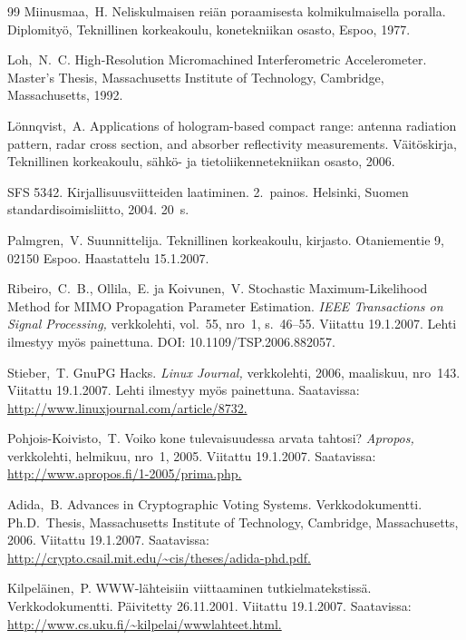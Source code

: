 \documentclass[english,12pt,a4paper,pdftex,sci,utf8]{aaltothesis}
\begin{document}
\begin{thebibliography}{99}
 Miinusmaa,\ H. Neliskulmaisen rei\"an poraamisesta
  kolmikulmaisella poralla. Diplomity\"o, Teknillinen korkeakoulu,
  konetekniikan osasto, Espoo, 1977.

 Loh,\ N.\ C. High-Resolution Micromachined
  Interferometric Accelerometer. Master's Thesis, Massachusetts
  Institute of Technology, Cambridge,
  Massachusetts, 1992.

 L\"onnqvist,\ A.
  Applications of hologram-based compact
    range: antenna radiation pattern, radar cross section, and
    absorber reflectivity measurements.
  V\"ait\"oskirja, Teknillinen korkeakoulu, s\"ahk\"o- ja tietoliikennetekniikan
  osasto, 2006.

 SFS 5342. Kirjallisuusviitteiden laatiminen. 2.\ painos.
  Helsinki, Suomen standardisoimisliitto, 2004. 20~s.

 Palmgren,\ V. Suunnittelija. Teknillinen
  korkeakoulu, kirjasto. Otaniementie 9, 02150 Espoo. Haastattelu
  15.1.2007.

 Ribeiro,\ C.\ B., Ollila,\ E. ja Koivunen,\ V.
  Stochastic Maximum-Likelihood Method for
    MIMO Propagation Parameter Estimation.
 \textit{IEEE Transactions
    on Signal Processing,} verkkolehti, vol.\ 55, nro~1, s.\ 46--55.
  Viitattu 19.1.2007. Lehti ilmestyy my\"os painettuna. DOI:
  10.1109/TSP.2006.882057.

 Stieber,\ T. GnuPG Hacks. \textit{Linux Journal,}
  verkkolehti, 2006, maaliskuu, nro~143. Viitattu 19.1.2007. Lehti
  ilmestyy my\"os painettuna. Saatavissa:
  \url{http://www.linuxjournal.com/article/8732.}

 Pohjois-Koivisto,\ T. Voiko kone tulevaisuudessa arvata
  tahtosi?  \textit{Apropos,} verkkolehti, helmikuu, nro~1, 2005.
  Viitattu 19.1.2007.  Saatavissa:
  \url{http://www.apropos.fi/1-2005/prima.php.}

 Adida,\ B.  Advances in Cryptographic Voting Systems.
  Verkkodokumentti. Ph.D.\ Thesis, Massachusetts Institute of
  Technology, Cambridge, 
  Massachusetts,
  2006. Viitattu 19.1.2007.  Saatavissa:
  \url{http://crypto.csail.mit.edu/~cis/theses/adida-phd.pdf.}

 Kilpel\"ainen,\ P. WWW-l\"ahteisiin viittaaminen
  tutkielmatekstiss\"a. Verkkodokumentti. P\"aivitetty 26.11.2001.
  Viitattu 19.1.2007. Saatavissa:
  \url{http://www.cs.uku.fi/~kilpelai/wwwlahteet.html.}

\end{thebibliography}
\end{document}
